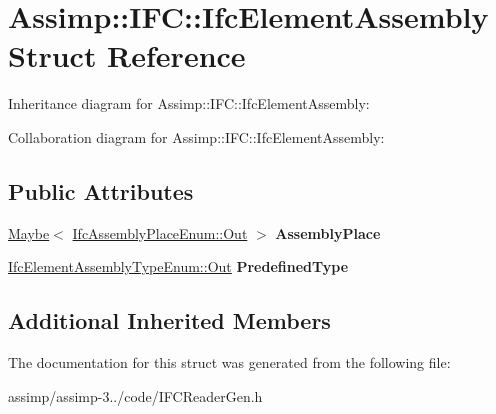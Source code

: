 \hypertarget{struct_assimp_1_1_i_f_c_1_1_ifc_element_assembly}{\section{Assimp\+:\+:I\+F\+C\+:\+:Ifc\+Element\+Assembly Struct Reference}
\label{struct_assimp_1_1_i_f_c_1_1_ifc_element_assembly}
}


Inheritance diagram for Assimp\+:\+:I\+F\+C\+:\+:Ifc\+Element\+Assembly\+:


Collaboration diagram for Assimp\+:\+:I\+F\+C\+:\+:Ifc\+Element\+Assembly\+:
\subsection*{Public Attributes}
\begin{DoxyCompactItemize}
\item 
\hypertarget{struct_assimp_1_1_i_f_c_1_1_ifc_element_assembly_a5a1d74616a721380511c02c2b9fb992f}{\hyperlink{struct_assimp_1_1_s_t_e_p_1_1_maybe}{Maybe}$<$ \hyperlink{classboost_1_1shared__ptr}{Ifc\+Assembly\+Place\+Enum\+::\+Out} $>$ {\bfseries Assembly\+Place}}\label{struct_assimp_1_1_i_f_c_1_1_ifc_element_assembly_a5a1d74616a721380511c02c2b9fb992f}

\item 
\hypertarget{struct_assimp_1_1_i_f_c_1_1_ifc_element_assembly_a749f9bbb17df58c171704c2c1361c18e}{\hyperlink{classboost_1_1shared__ptr}{Ifc\+Element\+Assembly\+Type\+Enum\+::\+Out} {\bfseries Predefined\+Type}}\label{struct_assimp_1_1_i_f_c_1_1_ifc_element_assembly_a749f9bbb17df58c171704c2c1361c18e}

\end{DoxyCompactItemize}
\subsection*{Additional Inherited Members}


The documentation for this struct was generated from the following file\+:\begin{DoxyCompactItemize}
\item 
assimp/assimp-\/3../code/I\+F\+C\+Reader\+Gen.\+h\end{DoxyCompactItemize}
